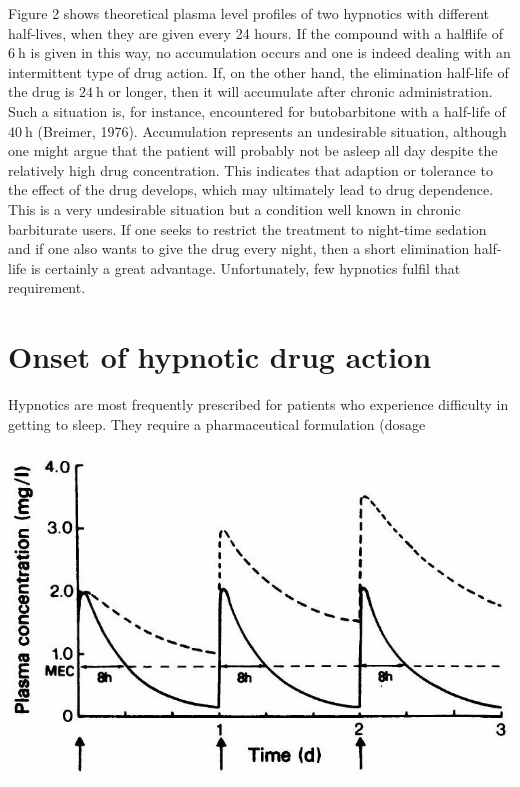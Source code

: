 \documentclass[10pt]{article}
\begin{document}
Figure 2 shows theoretical plasma level profiles of two hypnotics with different half-lives, when they are given every 24 hours. If the compound with a halflife of $6 \mathrm{~h}$ is given in this way, no accumulation occurs and one is indeed dealing with an intermittent type of drug action. If, on the other hand, the elimination half-life of the drug is $24 \mathrm{~h}$ or longer, then it will accumulate after chronic administration. Such a situation is, for instance, encountered for butobarbitone with a half-life of $40 \mathrm{~h}$ (Breimer, 1976). Accumulation represents an undesirable situation, although one might argue that the patient will probably not be asleep all day despite the relatively high drug concentration. This indicates that adaption or tolerance to the effect of the drug develops, which may ultimately lead to drug dependence. This is a very undesirable situation but a condition well known in chronic barbiturate users. If one seeks to restrict the treatment to night-time sedation and if one also wants to give the drug every night, then a short elimination half-life is certainly a great advantage. Unfortunately, few hypnotics fulfil that requirement.

\section*{Onset of hypnotic drug action}
Hypnotics are most frequently prescribed for patients who experience difficulty in getting to sleep. They require a pharmaceutical formulation (dosage

\begin{center}
\includegraphics[max width=\textwidth]{2024_06_20_8ae6f73ba2f120e73ed4g-3}
\end{center}
\end{document}
